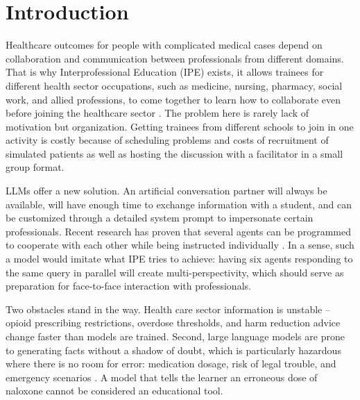 \documentclass[pdflatex,sn-mathphys-num]{sn-jnl}
\theoremstyle{thmstyleone}
\theoremstyle{thmstyletwo}
\theoremstyle{thmstylethree}
\begin{document}

\maketitle

\section{Introduction}\label{sec:intro}

Healthcare outcomes for people with complicated medical cases depend on collaboration and communication between professionals from different domains. That is why Interprofessional Education (IPE) exists, it allows trainees for different health sector occupations, such as medicine, nursing, pharmacy, social work, and allied professions, to come together to learn how to collaborate even before joining the healthcare sector \cite{reeves2016ipe,who2010ipe}. The problem here is rarely lack of motivation but organization. Getting trainees from different schools to join in one activity is costly because of scheduling problems and costs of recruitment of simulated patients as well as hosting the discussion with a facilitator in a small group format.

LLMs offer a new solution. An artificial conversation partner will always be available, will have enough time to exchange information with a student, and can be customized through a detailed system prompt to impersonate certain professionals. Recent research has proven that several agents can be programmed to cooperate with each other while being instructed individually \cite{park2023generative,wu2023autogen}. In a sense, such a model would imitate what IPE tries to achieve: having six agents responding to the same query in parallel will create multi-perspectivity, which should serve as preparation for face-to-face interaction with professionals.

Two obstacles stand in the way. Health care sector information is unstable – opioid prescribing restrictions, overdose thresholds, and harm reduction advice change faster than models are trained. Second, large language models are prone to generating facts without a shadow of doubt, which is particularly hazardous where there is no room for error: medication dosage, risk of legal trouble, and emergency scenarios \cite{ji2023survey,singhal2023medpalm}. A model that tells the learner an erroneous dose of naloxone cannot be considered an educational tool.
\end{document}

